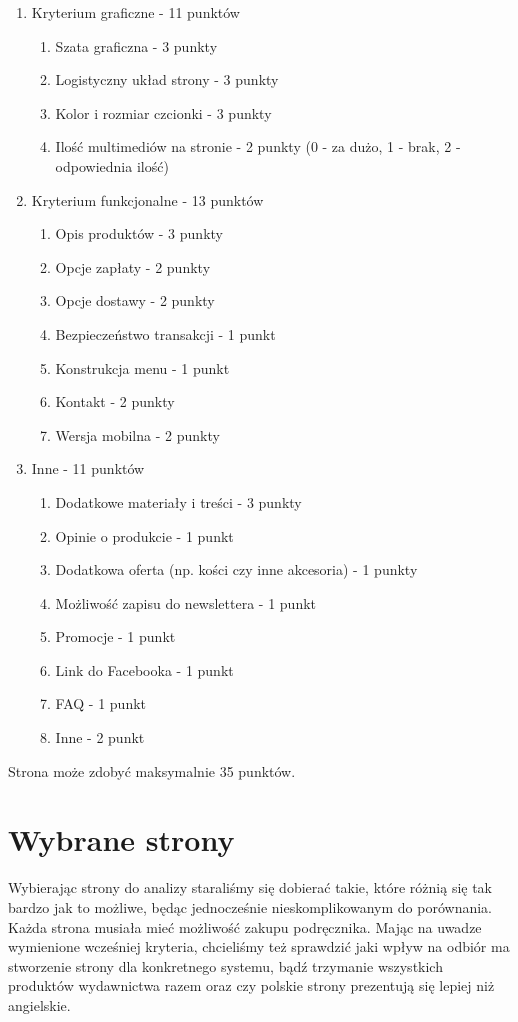 \documentclass[a4paper,11pt]{article}
\begin{document}
\begin{enumerate}
	\item Kryterium graficzne - 11 punktów
	\begin{enumerate}
		\item Szata graficzna - 3 punkty
		\item Logistyczny układ strony - 3 punkty 
		\item Kolor i rozmiar czcionki - 3 punkty
		\item Ilość multimediów na stronie - 2 punkty (0 - za dużo, 1 - brak, 2 - odpowiednia ilość)
	\end{enumerate} 
	\item Kryterium funkcjonalne - 13 punktów
	\begin{enumerate}
		\item Opis produktów - 3 punkty
		\item Opcje zapłaty - 2 punkty
		\item Opcje dostawy - 2 punkty
		\item Bezpieczeństwo transakcji - 1 punkt
		\item Konstrukcja menu - 1 punkt
		\item Kontakt - 2 punkty
		\item Wersja mobilna - 2 punkty
	\end{enumerate} 
	\item Inne - 11 punktów
	\begin{enumerate}
		\item Dodatkowe materiały i treści - 3 punkty
		\item Opinie o produkcie - 1 punkt
		\item Dodatkowa oferta (np. kości czy inne akcesoria) - 1 punkty
		\item Możliwość zapisu do newslettera - 1 punkt
		\item Promocje - 1 punkt
		\item Link do Facebooka - 1 punkt
		\item FAQ - 1 punkt
		\item Inne - 2 punkt
	\end{enumerate} 
\end{enumerate} 

Strona może zdobyć maksymalnie 35 punktów.


\section {Wybrane strony}

Wybierając strony do analizy staraliśmy się dobierać takie, które różnią się tak bardzo jak to możliwe, będąc jednocześnie nieskomplikowanym do porównania. Każda strona musiała mieć możliwość zakupu podręcznika. Mając na uwadze wymienione wcześniej kryteria, chcieliśmy też sprawdzić jaki wpływ na odbiór ma stworzenie strony dla konkretnego systemu, bądź trzymanie wszystkich produktów wydawnictwa razem oraz czy polskie strony prezentują się lepiej niż angielskie. \\
\end{document}
